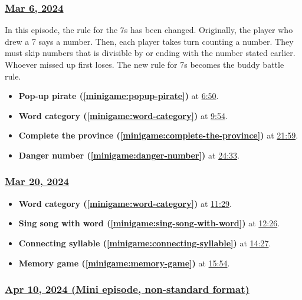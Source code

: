 \documentclass{article}
\begin{document}
\subsubsection{\href{https://youtu.be/YNhAqPVJzhM}{Mar 6, 2024}}

In this episode, the rule for the 7s has been changed. Originally, the player who drew a  7 says a number. Then, each player takes turn counting a number. They must skip numbers that is divisible by or ending with the number stated earlier. Whoever missed up first loses. The new rule for 7s becomes the buddy battle rule.

\begin{itemize}
    \item \textbf{Pop-up pirate (\ref{minigame:popup-pirate})} at \href{https://youtu.be/YNhAqPVJzhM?t=410}{6:50}.
    \item \textbf{Word category (\ref{minigame:word-category})} at \href{https://youtu.be/YNhAqPVJzhM?t=594}{9:54}.
    \item \textbf{Complete the province (\ref{minigame:complete-the-province})} at \href{https://youtu.be/YNhAqPVJzhM?t=1319}{21:59}.
    \item \textbf{Danger number (\ref{minigame:danger-number})} at \href{https://youtu.be/YNhAqPVJzhM?t=1473}{24:33}.
\end{itemize}

\subsubsection{\href{https://youtu.be/4bcct_p0UHI}{Mar 20, 2024}}

\begin{itemize}
    \item \textbf{Word category (\ref{minigame:word-category})} at \href{https://youtu.be/4bcct_p0UHI?t=689}{11:29}.
    \item \textbf{Sing song with word (\ref{minigame:sing-song-with-word})} at \href{https://youtu.be/4bcct_p0UHI?t=746}{12:26}.
    \item \textbf{Connecting syllable (\ref{minigame:connecting-syllable})} at \href{https://youtu.be/4bcct_p0UHI?t=867}{14:27}.
    \item \textbf{Memory game (\ref{minigame:memory-game})} at \href{https://youtu.be/4bcct_p0UHI?t=954}{15:54}.
\end{itemize}

\subsubsection{\href{https://youtu.be/2twXtyOaeb4}{Apr 10, 2024 (Mini episode, non-standard format)}}
\end{document}

